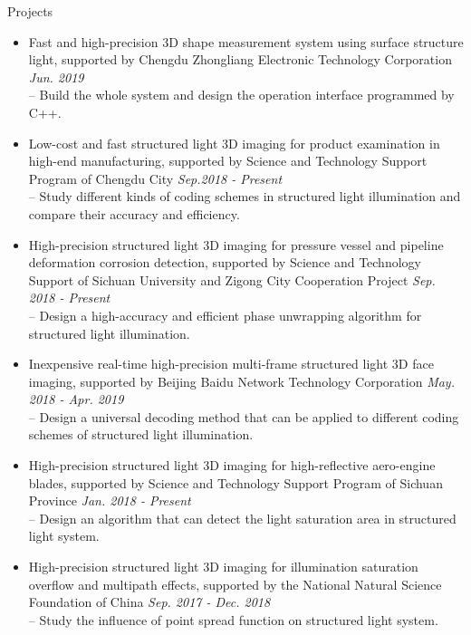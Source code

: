 \documentclass{resume} %
\begin{document}
\begin{rSection}{Projects}
	\begin{itemize}[leftmargin=*]
		\item Fast and high-precision 3D shape measurement system using surface structure light, supported by Chengdu Zhongliang Electronic Technology Corporation \hfill{\em Jun. 2019}\vspace{1.5mm}\\	
		-- Build the whole system and design the operation interface programmed by C++.
		
		\item  Low-cost and fast structured light 3D imaging for product examination in high-end manufacturing, supported by Science and Technology Support Program of Chengdu City 
		\hfill {\em Sep.2018 - Present}\vspace{1.5mm}\\
		-- Study different kinds of coding schemes in structured light illumination and compare their accuracy and efficiency.
		
		\item  High-precision structured light 3D imaging for pressure vessel and pipeline deformation corrosion detection, supported by Science and Technology Support of Sichuan University and Zigong City Cooperation Project \hfill {\em Sep. 2018 - Present}\vspace{1.5mm}\\
		-- Design a high-accuracy and efficient phase unwrapping algorithm for structured light illumination.
		
		\item  Inexpensive real-time high-precision multi-frame structured light 3D face imaging, supported by Beijing Baidu Network Technology Corporation 
		\hfill {\em May. 2018 - Apr. 2019}\vspace{1.5mm}\\
		-- Design a universal decoding method that can be applied to different coding schemes of structured light illumination.
				
		\item  High-precision structured light 3D imaging for high-reflective aero-engine blades, supported by Science and Technology Support Program of Sichuan Province 
		\hfill {\em Jan. 2018 - Present}\vspace{1.5mm}\\
		-- Design an algorithm that can detect the light saturation area in structured light system.
		
		\item  High-precision structured light 3D imaging for illumination saturation overflow and multipath effects, supported by the National Natural Science Foundation of China 
		\hfill {\em Sep. 2017 - Dec. 2018}\vspace{1.5mm}\\		
		-- Study the influence of point spread function on structured light system.
		

\end{itemize}
\end{rSection}
\end{document}
